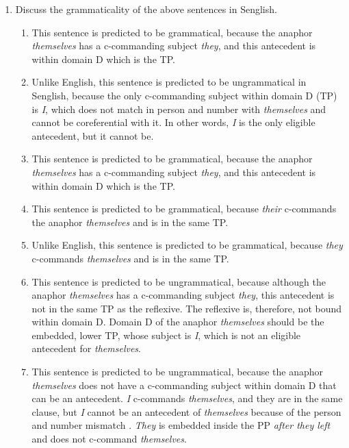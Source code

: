 \documentclass[a4paper,12pt]{article}
\begin{document}
\begin{enumerate}
    	\begin{enumerate}[label=(\roman*)]
        	\item Discuss the grammaticality of the above sentences in Senglish.

         \begin{enumerate}[label=(\alph*)]
            \item This sentence is predicted to be grammatical, because the anaphor \textit{themselves} has a c-commanding subject \textit{they}, and this antecedent is within domain D which is the TP.

            \item Unlike English, this sentence is predicted to be ungrammatical in Senglish, because the only c-commanding subject within domain D (TP) is \textit{I}, which does not match in person and number with \textit{themselves} and cannot be coreferential with it. In other words, \textit{I} is the only eligible antecedent, but it cannot be.

            \item This sentence is predicted to be grammatical, because the anaphor \textit{themselves} has a c-commanding subject \textit{they}, and this antecedent is within domain D which is the TP.

            \item This sentence is predicted to be grammatical, because \textit{their} c-commands the anaphor \textit{themselves} and is in the same TP.

            \item Unlike English, this sentence is predicted to be grammatical, because \textit{they} c-commands \textit{themselves} and is in the same TP.

            \item This sentence is predicted to be ungrammatical, because although the anaphor \textit{themselves} has a c-commanding subject \textit{they}, this antecedent is not in the same TP as the reflexive. The reflexive is, therefore, not bound within domain D. Domain D of the anaphor \textit{themselves} should be the embedded, lower TP, whose subject is \textit{I}, which is not an eligible antecedent for \textit{themselves}.

            \item  This sentence is predicted to be ungrammatical, because the anaphor \textit{themselves} does not have a c-commanding subject within domain D that can be an antecedent. \textit{I} c-commands \textit{themselves}, and they are in the same clause, but \textit{I} cannot be an antecedent of \textit{themselves} because of the person and number mismatch
            . \textit{They} is embedded inside the PP \textit{after they left} and does not c-command \textit{themselves}.
            \end{enumerate}
        \end{enumerate}
\end{enumerate}
\end{document}

